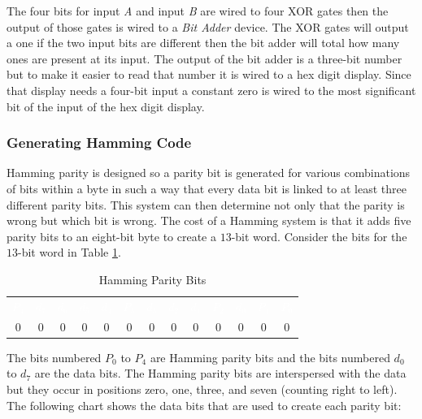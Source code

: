 The four bits for input \emph{A} and input \emph{B} are wired to four \textsf{XOR} gates then the output of those gates is wired to a \emph{Bit Adder} device. The \textsf{XOR} gates will output a one if the two input bits are different then the bit adder will total how many ones are present at its input. The output of the bit adder is a three-bit number but to make it easier to read that number it is wired to a hex digit display. Since that display needs a four-bit input a constant zero is wired to the most significant bit of the input of the hex digit display.

\subsubsection{Generating Hamming Code}
\label{CL:subsubsec:generating_hamming_code}

Hamming parity is designed so a parity bit is generated for various combinations of bits within a byte in such a way that every data bit is linked to at least three different parity bits. This system can then determine not only that the parity is wrong but which bit is wrong. The cost of a Hamming system is that it adds five parity bits to an eight-bit byte to create a $ 13 $-bit word. Consider the bits for the $ 13 $-bit word in Table \ref{cl:tab:hamming_parity_bits}.

\begin{table}[H]
  \sffamily
  \newcommand{\head}[1]{\textcolor{white}{\textbf{#1}}}		
  \begin{center}
    \begin{tabular}{ccccccccccccc} 
      \rowcolor{black!75}
      \head{$ P_4 $} & \head{$ d_7 $} & \head{$ d_6 $} &
      \head{$ d_5 $} & \head{$ d_4 $} & \head{$ P_3 $} &
      \head{$ d_3 $} & \head{$ d_2 $} & \head{$ d_1 $} &
      \head{$ P_2 $} & \head{$ d_0 $} & \head{$ P_1 $} &
      \head{$ P_0 $} \\
      $ 0 $ & $ 0 $ & $ 0 $ &
      $ 0 $ & $ 0 $ & $ 0 $ &
      $ 0 $ & $ 0 $ & $ 0 $ &
      $ 0 $ & $ 0 $ & $ 0 $ &
      $ 0 $ 
    \end{tabular}
  \end{center}
  \caption{Hamming Parity Bits}
  \label{cl:tab:hamming_parity_bits}
\end{table}

The bits numbered $ P_0 $ to $ P_4 $ are Hamming parity bits and the bits numbered $ d_0 $ to $ d_7 $ are the data bits. The Hamming parity bits are interspersed with the data but they occur in positions zero, one, three, and seven (counting right to left). The following chart shows the data bits that are used to create each parity bit: 

